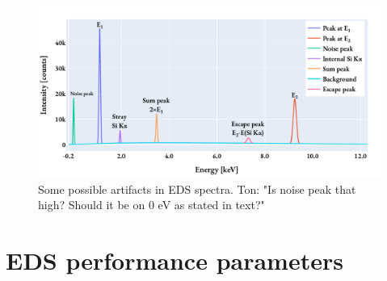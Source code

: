 \begin{figure}[htbp]
    \centering
    \includegraphics[width=0.95\linewidth]{figures/eds_artifacts.pdf}
    \caption{
        Some possible artifacts in EDS spectra.
        Ton: "Is noise peak that high? Should it be on 0 eV as stated in text?"
    }
    \label{fig:eds_artifacts}
\end{figure}





\clearpage








































\section{EDS performance parameters}
\label{theory:eds_performance}




